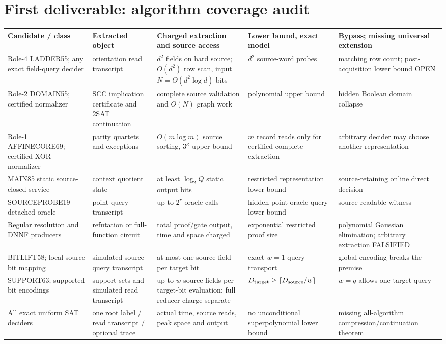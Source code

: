 \documentclass[11pt]{article}
\begin{document}
\section{First deliverable: algorithm coverage audit}
\begingroup\footnotesize\renewcommand{\arraystretch}{1.2}
\begin{tabularx}{\linewidth}{@{}p{0.91in}p{1.03in}p{1.43in}p{1.08in}X@{}}
\toprule
Candidate / class & Extracted object & Charged extraction and source access & Lower bound, exact model & Bypass; missing universal extension\\
\midrule
Role-4 LADDER55; any exact field-query decider & orientation read transcript & \(d^2\) fields on hard source; \(O(d^2)\) row scan, input \(N=\Theta(d^2\log d)\) bits & \(d^2\) source-word probes & matching row count; post-acquisition lower bound OPEN\\
Role-2 DOMAIN55; certified normalizer & SCC implication certificate and 2SAT continuation & complete source validation and \(O(N)\) graph work & polynomial upper bound & hidden Boolean domain collapse\\
Role-1 AFFINECORE69; certified XOR normalizer & parity quartets and exceptions & \(O(m\log m)\) source sorting, \(3^\kappa\) upper bound & \(m\) record reads only for certified complete extraction & arbitrary decider may choose another representation\\
MAIN85 static source-closed service & context quotient state & at least \(\log_2 Q\) static output bits & restricted representation lower bound & source-retaining online direct decision\\
SOURCEPROBE19 detached oracle & point-query transcript & up to \(2^r\) oracle calls & hidden-point oracle query lower bound & source-readable witness\\
Regular resolution and DNNF producers & refutation or full-function circuit & total proof/gate output, time and space charged & exponential restricted proof size & polynomial Gaussian elimination; arbitrary extraction FALSIFIED\\
BITLIFT58; local source bit mapping & simulated source query transcript & at most one source field per target bit & exact \(w=1\) query transport & global encoding breaks the premise\\
SUPPORT63; supported bit encodings & support sets and simulated read transcript & up to \(w\) source fields per target-bit evaluation; full reducer charge separate & \(D_{\rm target}\ge\lceil D_{\rm source}/w\rceil\) & \(w=q\) allows one target query\\
All exact uniform SAT deciders & one root label / read transcript / optional trace & actual time, source reads, peak space and output & no unconditional superpolynomial lower bound & missing all-algorithm compression/continuation theorem\\
\bottomrule
\end{tabularx}\endgroup
\end{document}
